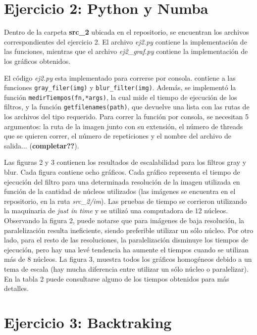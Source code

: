 \documentclass[12pt,a4paper]{article}
\begin{document}
\section{Ejercicio 2: Python y Numba}

Dentro de la carpeta \textbf{src\_2} ubicada en el repositorio, se encuentran los archivos correspondientes del ejercicio 2. El archivo \textit{ej2.py} contiene la implementación de las funciones, mientras que el archivo \textit{ej2\_graf.py} contiene la implementación de los gráficos obtenidos. \par 
El código \textit{ej2.py} esta implementado para correrse por consola.
contiene a las funciones \texttt{gray\_filer(img)} y \texttt{blur\_filter(img)}. Además, se implementó la función \texttt{medirTiempos(fn,*args)}, la cual mide el tiempo de ejecución de los filtros, y la función \texttt{getfilenames(path)}, que devuelve una lista con las rutas de los archivos del tipo requerido. Para correr la función por consola, se necesitan 5 argumentos: la ruta de la imagen junto con su extensión, el número de threads que se quieren correr, el número de repeticiones y el nombre del archivo de salida... (\textbf{completar??}).

Las figuras 2 y 3 contienen los resultados de escalabilidad para los filtros gray y blur. Cada figura contiene ocho gráficos. Cada gráfico representa el tiempo de ejecución del filtro para una determinada resolución de la imagen utilizada en función de la cantidad de núcleos utilizados (las imágenes se encuentra en el repositorio, en la ruta \textit{src\_2/im}). Las pruebas de tiempo se corrieron utilizando la maquinaria de \textit{just in time} y se utilizó  una computadora de 12 núcleos. Observando la figura 2, puede notarse que para imágenes de baja resolución, la paralelización resulta ineficiente, siendo preferible utilizar un sólo núcleo. Por otro lado, para el resto de las resoluciones, la paralelización disminuye los tiempos de ejecución, pero hay una levé tendencia ha aumente el tiempos cuando se utilizan más de 8 núcleos. La figura 3, muestra todos los gráficos homogéneos debido a un tema de escala (hay mucha diferencia entre utilizar un sólo núcleo o paralelizar). En la tabla 2 puede consultarse alguno de los tiempos obtenidos para más detalles. 



\section{Ejercicio 3: Backtraking}
\end{document}

